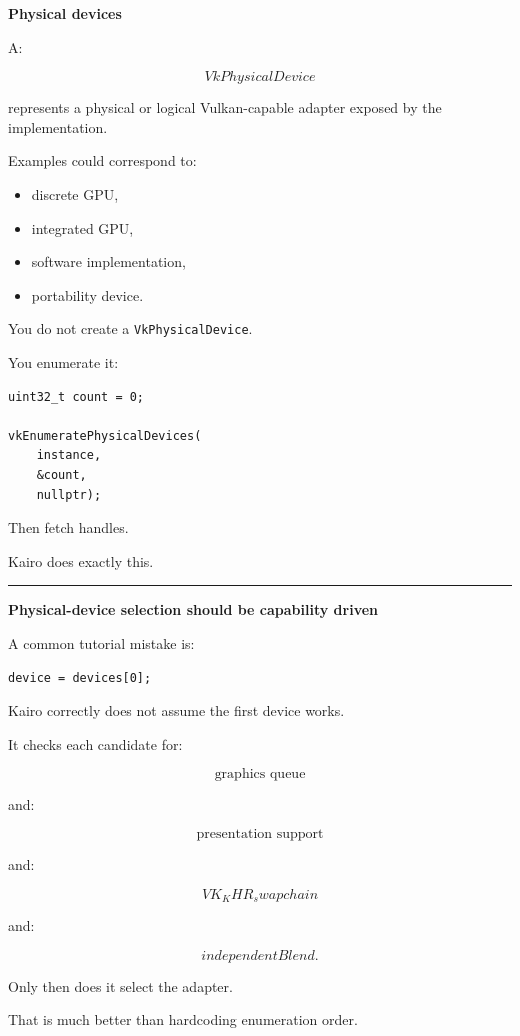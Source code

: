 \textbf{Physical devices}

A:

\[
VkPhysicalDevice
\]

represents a physical or logical Vulkan-capable adapter exposed by the implementation.

Examples could correspond to:

\begin{itemize}
\tightlist
\item
  discrete GPU,
\item
  integrated GPU,
\item
  software implementation,
\item
  portability device.
\end{itemize}

You do not create a \texttt{VkPhysicalDevice}.

You enumerate it:

\begin{verbatim}
uint32_t count = 0;

vkEnumeratePhysicalDevices(
    instance,
    &count,
    nullptr);
\end{verbatim}

Then fetch handles.

Kairo does exactly this.

\begin{center}\rule{0.5\linewidth}{0.5pt}\end{center}

\textbf{Physical-device selection should be capability driven}

A common tutorial mistake is:

\begin{verbatim}
device = devices[0];
\end{verbatim}

Kairo correctly does not assume the first device works.

It checks each candidate for:

\[
\text{graphics queue}
\]

and:

\[
\text{presentation support}
\]

and:

\[
VK_KHR_swapchain
\]

and:

\[
independentBlend.
\]

Only then does it select the adapter.

That is much better than hardcoding enumeration order.


